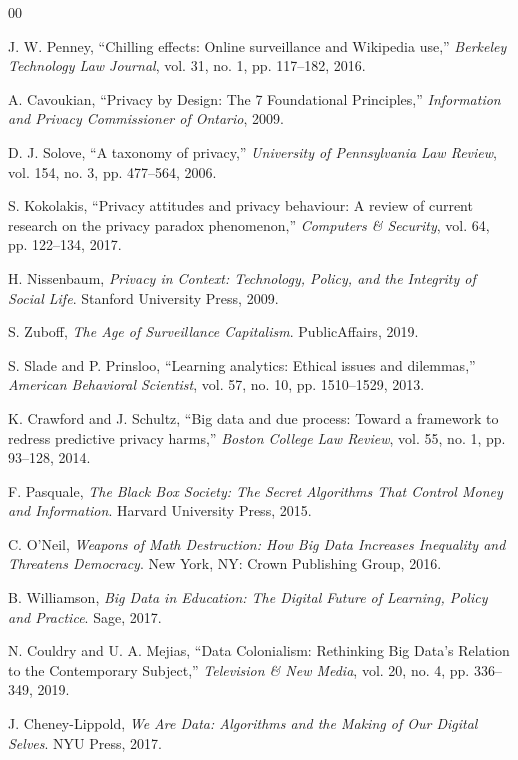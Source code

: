 \documentclass[conference]{IEEEtran}
\begin{document}
\begin{thebibliography}{00}

 J. W. Penney, ``Chilling effects: Online surveillance and Wikipedia use,'' \textit{Berkeley Technology Law Journal}, vol. 31, no. 1, pp. 117--182, 2016.

 A. Cavoukian, ``Privacy by Design: The 7 Foundational Principles,'' \textit{Information and Privacy Commissioner of Ontario}, 2009.

 D. J. Solove, ``A taxonomy of privacy,'' \textit{University of Pennsylvania Law Review}, vol. 154, no. 3, pp. 477--564, 2006.

 S. Kokolakis, ``Privacy attitudes and privacy behaviour: A review of current research on the privacy paradox phenomenon,'' \textit{Computers \& Security}, vol. 64, pp. 122--134, 2017.

 H. Nissenbaum, \textit{Privacy in Context: Technology, Policy, and the Integrity of Social Life}. Stanford University Press, 2009.

 S. Zuboff, \textit{The Age of Surveillance Capitalism}. PublicAffairs, 2019.

 S. Slade and P. Prinsloo, ``Learning analytics: Ethical issues and dilemmas,'' \textit{American Behavioral Scientist}, vol. 57, no. 10, pp. 1510--1529, 2013.

 K. Crawford and J. Schultz, ``Big data and due process: Toward a framework to redress predictive privacy harms,'' \textit{Boston College Law Review}, vol. 55, no. 1, pp. 93--128, 2014.

 F. Pasquale, \textit{The Black Box Society: The Secret Algorithms That Control Money and Information}. Harvard University Press, 2015.

 C. O'Neil, \textit{Weapons of Math Destruction: How Big Data Increases Inequality and Threatens Democracy}. New York, NY: Crown Publishing Group, 2016.

 B. Williamson, \textit{Big Data in Education: The Digital Future of Learning, Policy and Practice}. Sage, 2017.

 N. Couldry and U. A. Mejias, ``Data Colonialism: Rethinking Big Data's Relation to the Contemporary Subject,'' \textit{Television \& New Media}, vol. 20, no. 4, pp. 336--349, 2019.

 J. Cheney-Lippold, \textit{We Are Data: Algorithms and the Making of Our Digital Selves}. NYU Press, 2017.


\end{thebibliography}
\end{document}
